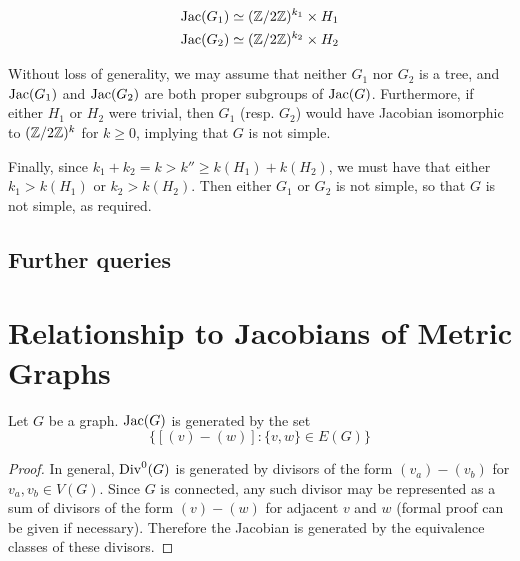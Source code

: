 \documentclass{amsart}
\begin{document}
\begin{align}
  \operatorname{Jac}(G_1) &\simeq (\mathbb{Z}/2\mathbb{Z})^{k_1} \times H_1 \\
  \operatorname{Jac}(G_2) &\simeq (\mathbb{Z}/2\mathbb{Z})^{k_2} \times H_2
\end{align}

Without loss of generality, we may assume that neither $G_1$ nor $G_2$
is a tree, and $\operatorname{Jac}(G_1)$ and $\operatorname{Jac}(G_2)$ are both proper subgroups
of $\operatorname{Jac}(G)$. Furthermore, if either $H_1$ or $H_2$ were trivial, then
$G_1$ (resp. $G_2$) would have Jacobian isomorphic to $(\mathbb{Z}/2\mathbb{Z})^k$ for
$k \ge 0$, implying that $G$ is not simple.

Finally, since $k_1 + k_2 = k > k'' \ge k(H_1) + k(H_2)$, we must have
that either $k_1 > k(H_1)$ or $k_2 > k(H_2)$. Then either $G_1$ or
$G_2$ is not simple, so that $G$ is not simple, as required.

\subsection{Further queries}

\section{Relationship to Jacobians of Metric Graphs}
\begin{lem}
  \label{lem:jac_generators}
  Let $G$ be a graph. $\operatorname{Jac}(G)$ is generated by the set \[\{[(v) -
  (w)]: \{v, w\} \in E(G)\}\]
\end{lem}

\begin{proof}
  In general, $\operatorname{Div}^0(G)$ is generated by divisors of the form $(v_a)
  - (v_b)$ for $v_a, v_b \in V(G)$. Since $G$ is connected, any such
  divisor may be represented as a sum of divisors of the form $(v) -
  (w)$ for adjacent $v$ and $w$ (formal proof can be given if
  necessary). Therefore the Jacobian is generated by the equivalence
  classes of these divisors.  
\end{proof}
\end{document}
